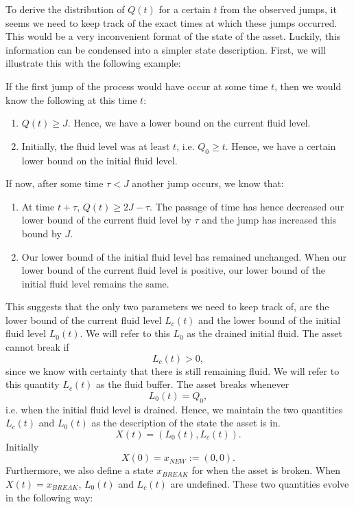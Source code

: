To derive the distribution of $Q(t)$ for a certain $t$ from the observed jumps, it seems we need to keep track of the exact times at which these jumps occurred.
This would be a very inconvenient format of the state of the asset.
Luckily, this information can be condensed into a simpler state description.
First, we will illustrate this with the following example:
\begin{example}
	If the first jump of the process would have occur at some time $t$, then we would know the following at this time $t$:
	\begin{enumerate}
		\item $Q(t)\geq J$.
		Hence, we have a lower bound on the current fluid level.
		\item Initially, the fluid level was at least $t$, i.e. $Q_0\geq t$.
		Hence, we have a certain lower bound on the initial fluid level.
	\end{enumerate}
	If now, after some time $\tau<J$ another jump occurs, we know that:
	\begin{enumerate}
		\item At time $t+\tau$, $Q(t)\geq 2J-\tau$.
		The passage of time has hence decreased our lower bound of the current fluid level by $\tau$ and the jump has increased this bound by $J$.
		\item Our lower bound of the initial fluid level has remained unchanged.
		When our lower bound of the current fluid level is positive, our lower bound of the initial fluid level remains the same.
	\end{enumerate}
\end{example}
This suggests that the only two parameters we need to keep track of, are the lower bound of the current fluid level $L_c(t)$ and the lower bound of the initial fluid level $L_0(t)$.
We will refer to this $L_0$ as the drained initial fluid.
The asset cannot break if 
\[L_c(t)>0,\]
since we know with certainty that there is still remaining fluid.
We will refer to this quantity $L_c(t)$ as the fluid buffer.
The asset breaks whenever
\[L_0(t)=Q_0,\]
i.e. when the initial fluid level is drained.
Hence, we maintain the two quantities $L_c(t)$ and $L_0(t)$ as the description of the state the asset is in.
\[
X(t)=(L_0(t),L_c(t)).
\]
Initially
\[
X(0)=x_{NEW}:=(0,0).
\]
Furthermore, we also define a state $x_{BREAK}$ for when the asset is broken.
When $X(t)=x_{BREAK}$, $L_0(t)$ and $L_c(t)$ are undefined.
These two quantities evolve in the following way:
